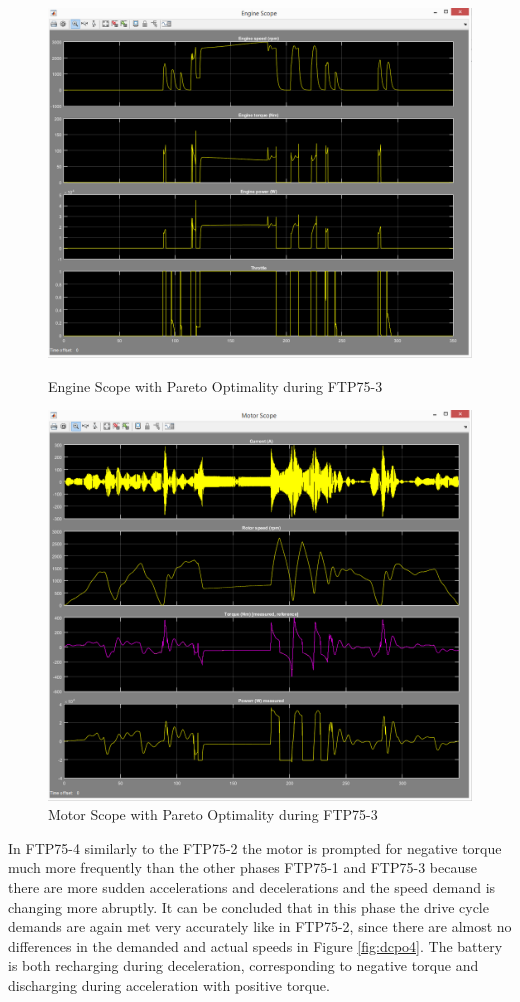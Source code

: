 \begin{figure}[hp]
\centering
\includegraphics[scale=0.37]{figures/Pareto/FTP75-3/engine08Juni}
\caption{Engine Scope with Pareto Optimality during FTP75-3}
\label{fig:epo3}
\includegraphics[scale=0.37]{figures/Pareto/FTP75-3/motor08Juni}
\caption{Motor Scope with Pareto Optimality during FTP75-3}
\label{fig:mpo3}
\end{figure}

In FTP75-4 similarly to the FTP75-2 the motor is prompted for negative torque much more frequently than the other phases FTP75-1 and FTP75-3 because there are more sudden accelerations and decelerations and the speed demand is changing more abruptly. It can be concluded that in this phase the drive cycle demands are again met very accurately like in FTP75-2, since there are almost no differences in the demanded and actual speeds in Figure \ref{fig:dcpo4}. The battery is both recharging during deceleration, corresponding to negative torque and discharging during acceleration with positive torque.


